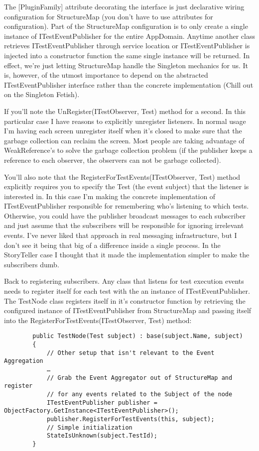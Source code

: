 \documentclass{article}
\begin{document}
{The [PluginFamily] attribute decorating the interface is just declarative wiring configuration for StructureMap (you don't have to use attributes for configuration).  Part of the StructureMap configuration is to only create a single instance of ITestEventPublisher for the entire AppDomain.  Anytime another class retrieves ITestEventPublisher through service location or ITestEventPublisher is injected into a constructor function the same single instance will be returned.  In effect, we're just letting StructureMap handle the Singleton mechanics for us.  It is, however, of the utmost importance to depend on the abstracted ITestEventPublisher interface rather than the concrete implementation (Chill out on the Singleton Fetish).

If you'll note the UnRegister(ITestObserver, Test) method for a second.  In this particular case I have reasons to explicitly unregister listeners.  In normal usage I'm having each screen unregister itself when it's closed to make sure that the garbage collection can reclaim the screen.  Most people are taking advantage of WeakReference's to solve the garbage collection problem (if the publisher keeps a reference to each observer, the observers can not be garbage collected).

You'll also note that the RegisterForTestEvents(ITestObserver, Test) method explicitly requires you to specify the Test (the event subject) that the listener is interested in.  In this case I'm making the concrete implementation of ITestEventPublisher responsible for remembering who's listening to which tests.  Otherwise, you could have the publisher broadcast messages to each subscriber and just assume that the subscribers will be responsible for ignoring irrelevant events.  I've never liked that approach in real messaging infrastructure, but I don't see it being that big of a difference inside a single process.  In the StoryTeller case I thought that it made the implementation simpler to make the subscribers dumb.

Back to registering subscribers.  Any class that listens for test execution events needs to register itself for each test with the an instance of ITestEventPublisher.  The TestNode class registers itself in it's constructor function by retrieving the configured instance of ITestEventPublisher from StructureMap and passing itself into the RegisterForTestEvents(ITestObserver, Test) method:

 \begin{lstlisting}
        public TestNode(Test subject) : base(subject.Name, subject)
        {
            // Other setup that isn't relevant to the Event Aggregation
            …
            // Grab the Event Aggregator out of StructureMap and register
            // for any events related to the Subject of the node
            ITestEventPublisher publisher = ObjectFactory.GetInstance<ITestEventPublisher>();
            publisher.RegisterForTestEvents(this, subject);
            // Simple initialization
            StateIsUnknown(subject.TestId);
        }
\end{lstlisting}		

}
\end{document}
